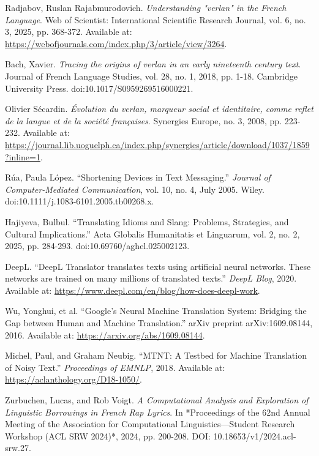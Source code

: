 \documentclass[12pt]{article}
\begin{document}
\begin{thebibliography}{9}

Radjabov, Ruslan Rajabmurodovich. \textit{Understanding "verlan" in the French Language}. 
Web of Scientist: International Scientific Research Journal, vol. 6, no. 3, 2025, pp. 368-372. 
Available at: \url{https://webofjournals.com/index.php/3/article/view/3264}.

Bach, Xavier. \textit{Tracing the origins of verlan in an early nineteenth century text}. 
Journal of French Language Studies, vol. 28, no. 1, 2018, pp. 1-18. 
Cambridge University Press. doi:10.1017/S0959269516000221.

Olivier Sécardin. \textit{Évolution du verlan, marqueur social et identitaire, comme reflet de la langue et de la société françaises}. 
Synergies Europe, no. 3, 2008, pp. 223-232. 
Available at: \url{https://journal.lib.uoguelph.ca/index.php/synergies/article/download/1037/1859?inline=1}.

Rúa, Paula López. “Shortening Devices in Text Messaging.” 
\textit{Journal of Computer-Mediated Communication}, vol. 10, no. 4, July 2005. 
Wiley. doi:10.1111/j.1083-6101.2005.tb00268.x.

Hajiyeva, Bulbul. “Translating Idioms and Slang: Problems, Strategies, and Cultural Implications.”  
Acta Globalis Humanitatis et Linguarum, vol. 2, no. 2, 2025, pp. 284-293. doi:10.69760/aghel.025002123.  

DeepL. “DeepL Translator translates texts using artificial neural networks. These networks are trained on many millions of translated texts.” 
\textit{DeepL Blog}, 2020. Available at: \url{https://www.deepl.com/en/blog/how-does-deepl-work}.

Wu, Yonghui, et al. “Google's Neural Machine Translation System: Bridging the Gap between Human and Machine Translation.” 
arXiv preprint arXiv:1609.08144, 2016. Available at: \url{https://arxiv.org/abs/1609.08144}.

Michel, Paul, and Graham Neubig. “MTNT: A Testbed for Machine Translation of Noisy Text.”
\textit{Proceedings of EMNLP}, 2018. Available at: \url{https://aclanthology.org/D18-1050/}.

Zurbuchen, Lucas, and Rob Voigt.  
\textit{A Computational Analysis and Exploration of Linguistic Borrowings in French Rap Lyrics}.  
In *Proceedings of the 62nd Annual Meeting of the Association for Computational Linguistics\;---\;Student Research Workshop (ACL SRW 2024)*, 2024, pp. 200-208.  
DOI: 10.18653/v1/2024.acl-srw.27.  


\end{thebibliography}
\end{document}
